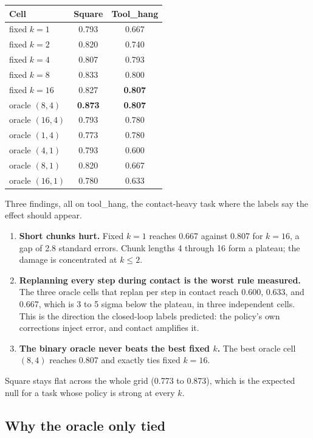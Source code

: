 \documentclass[11pt]{article}
\begin{document}
\begin{center}
\small
\begin{tabular}{@{}lcc@{}}
\toprule
Cell & Square & Tool\_hang \\
\midrule
fixed $k{=}1$  & 0.793 & 0.667 \\
fixed $k{=}2$  & 0.820 & 0.740 \\
fixed $k{=}4$  & 0.807 & 0.793 \\
fixed $k{=}8$  & 0.833 & 0.800 \\
fixed $k{=}16$ & 0.827 & \textbf{0.807} \\
\midrule
oracle $(8,4)$  & \textbf{0.873} & \textbf{0.807} \\
oracle $(16,4)$ & 0.793 & 0.780 \\
oracle $(1,4)$  & 0.773 & 0.780 \\
oracle $(4,1)$  & 0.793 & 0.600 \\
oracle $(8,1)$  & 0.820 & 0.667 \\
oracle $(16,1)$ & 0.780 & 0.633 \\
\bottomrule
\end{tabular}
\end{center}

Three findings, all on tool\_hang, the contact-heavy task where the labels
say the effect should appear.

\begin{enumerate}[leftmargin=1.6em]
\item \textbf{Short chunks hurt.} Fixed $k{=}1$ reaches 0.667 against 0.807
for $k{=}16$, a gap of 2.8 standard errors. Chunk lengths 4 through 16 form a
plateau; the damage is concentrated at $k \leq 2$.
\item \textbf{Replanning every step during contact is the worst rule
measured.} The three oracle cells that replan per step in contact reach
0.600, 0.633, and 0.667, which is 3 to 5 sigma below the plateau, in three
independent cells. This is the direction the closed-loop labels predicted:
the policy's own corrections inject error, and contact amplifies it.
\item \textbf{The binary oracle never beats the best fixed $k$.} The best
oracle cell $(8,4)$ reaches 0.807 and exactly ties fixed $k{=}16$.
\end{enumerate}

Square stays flat across the whole grid (0.773 to 0.873), which is the
expected null for a task whose policy is strong at every $k$.

\subsection{Why the oracle only tied}
\end{document}
